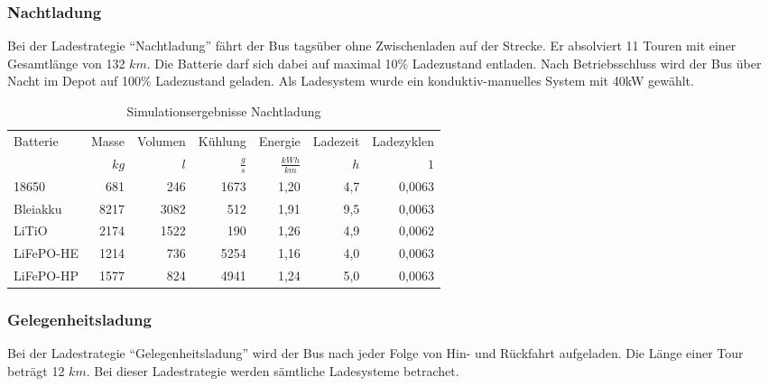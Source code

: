 \subsubsection{Nachtladung}
Bei der Ladestrategie "`Nachtladung"' fährt der Bus tagsüber ohne Zwischenladen auf der Strecke. Er absolviert 11 Touren mit einer Gesamtlänge von 132 $km$. Die Batterie darf sich dabei auf maximal 10\% Ladezustand entladen. Nach Betriebsschluss wird der Bus über Nacht im Depot auf 100\% Ladezustand geladen. Als Ladesystem wurde ein konduktiv-manuelles System mit 40kW gewählt.

\begin{table}[h!]\centering
	\begin{tabularx}{\textwidth}{Xrrrrrr}
		\toprule
		Batterie    & Masse & Volumen &       Kühlung &          Energie & Ladezeit & Ladezyklen \\
		            &  $kg$ &     $l$ & $\frac{g}{s}$ & $\frac{kWh}{km}$ &      $h$ &        $1$ \\ \midrule
		18650 &  681 &     246 &           1673 &              1,20 &       4,7   & 0,0063 \\
		Bleiakku    & 8217 &    3082 &           512 &              1,91 &      9,5    & 0,0063 \\
		LiTiO       &  2174 &    1522 &             190 &              1,26 &       4,9   & 0,0062 \\
		LiFePO-HE      &  1214 &    736 &          5254 &              1,16 &       4,0   & 0,0063 \\ 
		LiFePO-HP      &  1577 &    824 &          4941 &              1,24 &       5,0  & 0,0063 \\ \bottomrule
	\end{tabularx}
	\caption{Simulationsergebnisse Nachtladung}
\end{table}
\FloatBarrier
\subsubsection{Gelegenheitsladung}
Bei der Ladestrategie "`Gelegenheitsladung"' wird der Bus nach jeder Folge von Hin- und Rückfahrt aufgeladen. Die Länge einer Tour beträgt 12 $km$. Bei dieser Ladestrategie werden sämtliche Ladesysteme betrachet.

